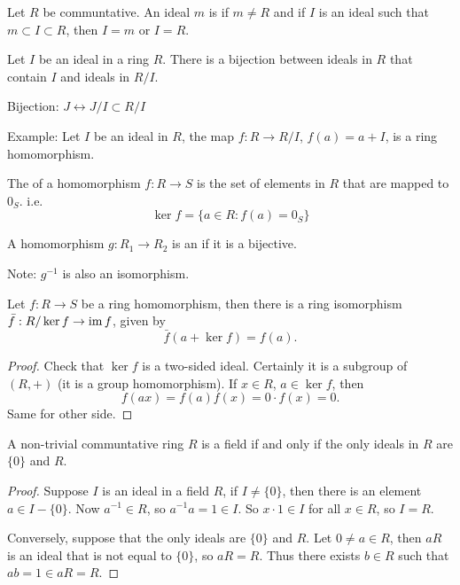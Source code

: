   \begin{define}
    Let $R$ be communtative. An ideal $m$ is  if $m \neq R$
    and if $I$ is an ideal such that $m \subset I \subset R$, then $I = m$ or
    $I = R$.
  \end{define}

  \begin{prop}\label{rings:quo_bij}
    Let $I$ be an ideal in a ring $R$. There is a bijection between ideals in
    $R$ that contain $I$ and ideals in $R/I$.
  \end{prop}

  Bijection: $ J \longleftrightarrow J/I \subset R/I $

  Example: Let $I$ be an ideal in $R$, the map $f: R \to R/I$,
  $f(a) = a + I$, is a ring homomorphism.

  \begin{define}
    The  of a homomorphism $f:R\to S$ is the set of elements in
    $R$ that are mapped to $0_S$. i.e.
    \[ \ker f = \{ a \in R : f(a) = 0_S \} \]
  \end{define}

  \begin{define}
    A homomorphism $g: R_1 \to R_2$ is an  if it is a
    bijective.
  \end{define}

  Note: $g^{-1}$ is also an isomorphism.

  \begin{prop}
    Let $f: R \to S$ be a ring homomorphism, then there is a ring isomorphism
    $\bar{f}: R/\ker{f} \to \operatorname{im}{f}$, given by
    \[ \bar{f}(a+\ker{f}) = f(a). \]
  \end{prop}

  \begin{proof}
    Check that $\ker{f}$ is a two-sided ideal. Certainly it is a subgroup of
    $(R, +)$ (it is a group homomorphism). If $x \in R$, $a \in \ker{f}$, then
    \[f(ax) = f(a)f(x) = 0\cdot f(x) = 0.\]
    Same for other side.
  \end{proof}

  \begin{lemma}
    A non-trivial communtative ring $R$ is a field if and only if the only
    ideals in $R$ are $\{0\}$ and $R$.
  \end{lemma}

  \begin{proof}
    Suppose $I$ is an ideal in a field $R$, if $I \neq \{0\}$, then there is
    an element $a\in I-\{0\}$. Now $a^{-1} \in R$, so $a^{-1}a = 1 \in I$. So
    $x\cdot 1 \in I$ for all $x \in R$, so $I = R$.

    Conversely, suppose that the only ideals are $\{0\}$ and $R$. Let
    $0 \neq a \in R$, then $aR$ is an ideal that is not equal to $\{0\}$, so
    $aR = R$. Thus there exists $b \in R$ such that $ab = 1 \in aR = R$.
  \end{proof}

